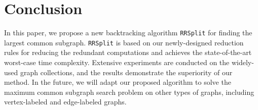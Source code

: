 \section{Conclusion}
\label{sec:conclusion}

In this paper, we propose a new backtracking algorithm \texttt{RRSplit} for finding the largest common subgraph.
%
\texttt{RRSplit} is based on our newly-designed reduction rules for reducing the redundant computations and achieves the state-of-the-art worst-case time complexity.
%
Extensive experiments are conducted on the widely-used graph collections, and the results demonstrate the superiority of our method. In the future, we will adapt our proposed algorithm to solve {\chengE the maximum common subgraph search problem on} other types of graphs, including vertex-labeled and edge-labeled graphs.

